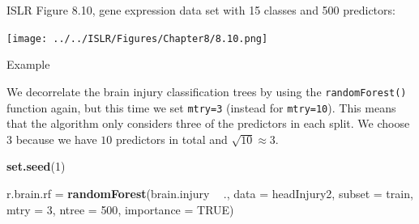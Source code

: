 \documentclass[10pt,ignorenonframetext,]{beamer}
\newenvironment{Shaded}{\begin{snugshade}}{\end{snugshade}}
\newcommand{\KeywordTok}[1]{\textcolor[rgb]{0.13,0.29,0.53}{\textbf{#1}}}
\newcommand{\DataTypeTok}[1]{\textcolor[rgb]{0.13,0.29,0.53}{#1}}
\newcommand{\DecValTok}[1]{\textcolor[rgb]{0.00,0.00,0.81}{#1}}
\newcommand{\StringTok}[1]{\textcolor[rgb]{0.31,0.60,0.02}{#1}}
\newcommand{\OtherTok}[1]{\textcolor[rgb]{0.56,0.35,0.01}{#1}}
\newcommand{\OperatorTok}[1]{\textcolor[rgb]{0.81,0.36,0.00}{\textbf{#1}}}
\newcommand{\NormalTok}[1]{#1}
\begin{document}
\begin{frame}

ISLR Figure 8.10, gene expression data set with 15 classes and 500
predictors:

\centering
\texttt{[image: ../../ISLR/Figures/Chapter8/8.10.png]}

\end{frame}

\begin{frame}[fragile]

\begin{block}{Example}

\vspace{2mm}

We decorrelate the brain injury classification trees by using the
\texttt{randomForest()} function again, but this time we set
\texttt{mtry=3} (instead for \texttt{mtry=10}). This means that the
algorithm only considers three of the predictors in each split. We
choose \(3\) because we have \(10\) predictors in total and
\(\sqrt{10}\approx 3\).

\scriptsize

\begin{Shaded}
\begin{Highlighting}[]
\KeywordTok{set.seed}\NormalTok{(}\DecValTok{1}\NormalTok{)}

\NormalTok{r.brain.rf =}\StringTok{ }\KeywordTok{randomForest}\NormalTok{(brain.injury }\OperatorTok{~}\StringTok{ }\NormalTok{., }\DataTypeTok{data =}\NormalTok{ headInjury2, }\DataTypeTok{subset =}\NormalTok{ train, }
    \DataTypeTok{mtry =} \DecValTok{3}\NormalTok{, }\DataTypeTok{ntree =} \DecValTok{500}\NormalTok{, }\DataTypeTok{importance =} \OtherTok{TRUE}\NormalTok{)}
\end{Highlighting}
\end{Shaded}

\end{block}

\end{frame}
\end{document}
